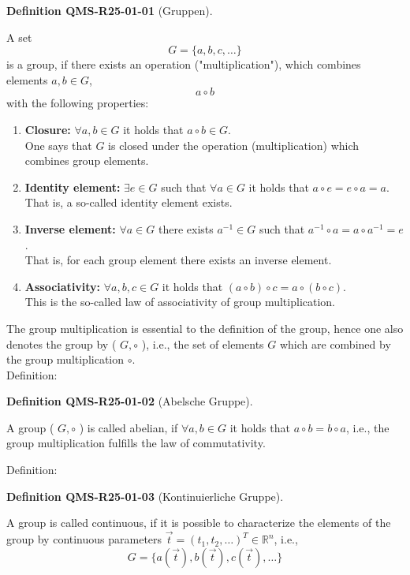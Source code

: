 \documentclass[10pt, letterpaper]{article}
\newcommand{\CustomHeading}[3]{%
  \par\medskip\noindent%
  \textbf{#1 #2} \textnormal{(#3)}.\enskip%
}
\newenvironment{DEF}[2]{\begin{unitbox}\CustomHeading{Definition}{#1}{#2}}{\end{unitbox}}
\begin{document}
\begin{DEF}{QMS-R25-01-01}{Gruppen}
A set
$$
G=\{a, b, c, \ldots\}
$$
is a group, if there exists an operation ("multiplication"), which combines elements $a, b \in G$,
$$
a \circ b
$$
with the following properties:\\
\begin{enumerate}
  \item \textbf{Closure:} $\forall a, b \in G$ it holds that $a \circ b \in G$.\\
  One says that $G$ is closed under the operation (multiplication) which combines group elements.
  
  \item \textbf{Identity element:} $\exists e \in G$ such that $\forall a \in G$ it holds that $a \circ e = e \circ a = a$.\\
  That is, a so-called identity element exists.

  \item \textbf{Inverse element:} $\forall a \in G$ there exists $a^{-1} \in G$ such that $a^{-1} \circ a = a \circ a^{-1} = e$.\\
  That is, for each group element there exists an inverse element.

  \item \textbf{Associativity:} $\forall a, b, c \in G$ it holds that $(a \circ b) \circ c = a \circ (b \circ c)$.\\
  This is the so-called law of associativity of group multiplication.
\end{enumerate}
\end{DEF}


The group multiplication is essential to the definition of the group, hence one also denotes the group by ( $G, \circ$ ), i.e., the set of elements $G$ which are combined by the group multiplication $\circ$.\\


Definition: 

\begin{DEF}{QMS-R25-01-02}{Abelsche Gruppe}
A group ( $G, \circ$ ) is called abelian, if $\forall a, b \in G$ it holds that $a \circ b=b \circ a$, i.e., the group multiplication fulfills the law of commutativity.
\end{DEF}


Definition: 


\begin{DEF}{QMS-R25-01-03}{Kontinuierliche Gruppe}
A group is called continuous, if it is possible to characterize the elements of the group by continuous parameters $\vec{t}=\left(t_{1}, t_{2}, \ldots\right)^{T} \in \mathbb{R}^{n}$, i.e.,
$$
G=\{a(\vec{t}), b(\vec{t}), c(\vec{t}), \ldots\}
$$
\end{DEF}
\end{document}
